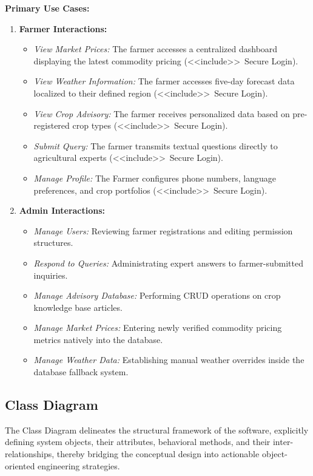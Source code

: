 \textbf{Primary Use Cases:}
\begin{enumerate}
    \item \textbf{Farmer Interactions:}
    \begin{itemize}
        \item \textit{View Market Prices:} The farmer accesses a centralized dashboard displaying the latest commodity pricing (\textless\textless include\textgreater\textgreater\ Secure Login).
        \item \textit{View Weather Information:} The farmer accesses five-day forecast data localized to their defined region (\textless\textless include\textgreater\textgreater\ Secure Login).
        \item \textit{View Crop Advisory:} The farmer receives personalized data based on pre-registered crop types (\textless\textless include\textgreater\textgreater\ Secure Login).
        \item \textit{Submit Query:} The farmer transmits textual questions directly to agricultural experts (\textless\textless include\textgreater\textgreater\ Secure Login).
        \item \textit{Manage Profile:} The Farmer configures phone numbers, language preferences, and crop portfolios (\textless\textless include\textgreater\textgreater\ Secure Login).
    \end{itemize}
    
    \item \textbf{Admin Interactions:}
    \begin{itemize}
        \item \textit{Manage Users:} Reviewing farmer registrations and editing permission structures.
        \item \textit{Respond to Queries:} Administrating expert answers to farmer-submitted inquiries.
        \item \textit{Manage Advisory Database:} Performing CRUD operations on crop knowledge base articles.
        \item \textit{Manage Market Prices:} Entering newly verified commodity pricing metrics natively into the database.
        \item \textit{Manage Weather Data:} Establishing manual weather overrides inside the database fallback system.
    \end{itemize}
\end{enumerate}

\subsection{Class Diagram}
The Class Diagram delineates the structural framework of the software, explicitly defining system objects, their attributes, behavioral methods, and their inter-relationships, thereby bridging the conceptual design into actionable object-oriented engineering strategies.

